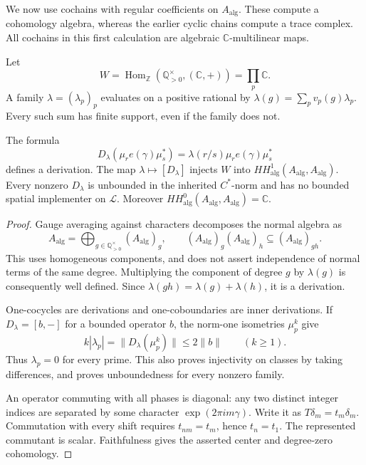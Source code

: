 We now use cochains with regular coefficients on $A_{\mathrm{alg}}$. These
compute a cohomology algebra, whereas the earlier cyclic chains compute a
trace complex. All cochains in this first calculation are algebraic $\mathbb
C$-multilinear maps.

Let
\[
 W=\operatorname{Hom}_{\mathbb Z}
        (\mathbb Q_{>0}^{\times},(\mathbb C,+))
   =\prod_p\mathbb C.
\]
A family $\lambda=(\lambda_p)_p$ evaluates on a positive rational by
$\lambda(g)=\sum_p v_p(g)\lambda_p$. Every such sum has finite support, even
if the family does not.

\begin{proposition}
\label{v4-arith:traces:gauge-derivations}
The formula
\[
 D_\lambda(\mu_re(\gamma)\mu_s^*)
  =\lambda(r/s)\mu_re(\gamma)\mu_s^*
\]
defines a derivation. The map $\lambda\mapsto[D_\lambda]$ injects $W$ into
$HH^1_{\mathrm{alg}}(A_{\mathrm{alg}},A_{\mathrm{alg}})$. Every nonzero
$D_\lambda$ is unbounded in the inherited $C^*$-norm and has no bounded
spatial implementer on $\mathcal L$. Moreover
$HH^0_{\mathrm{alg}}(A_{\mathrm{alg}},A_{\mathrm{alg}}) =\mathbb C$.
\end{proposition}
\begin{proof}
Gauge averaging against characters decomposes the normal algebra as
\[
 A_{\mathrm{alg}}
  =\bigoplus_{g\in\mathbb Q_{>0}^{\times}}(A_{\mathrm{alg}})_g,
 \qquad
 (A_{\mathrm{alg}})_g(A_{\mathrm{alg}})_h
       \subseteq(A_{\mathrm{alg}})_{gh}.
\]
This uses homogeneous components, and does not assert independence of normal
terms of the same degree. Multiplying the component of degree $g$ by
$\lambda(g)$ is consequently well defined. Since
$\lambda(gh)=\lambda(g)+\lambda(h)$, it is a derivation.

One-cocycles are derivations and one-coboundaries are inner derivations. If
$D_\lambda=[b,-]$ for a bounded operator $b$, the norm-one isometries
$\mu_p^k$ give
\[
 k|\lambda_p|=\|D_\lambda(\mu_p^k)\|
      \leq2\|b\|\qquad(k\geq1).
\]
Thus $\lambda_p=0$ for every prime. This also proves injectivity on classes
by taking differences, and proves unboundedness for every nonzero family.

An operator commuting with all phases is diagonal: any two distinct integer
indices are separated by some character $\exp(2\pi i m\gamma)$. Write it as
$T\delta_m=t_m\delta_m$. Commutation with every shift requires $t_{nm}=t_m$,
hence $t_n=t_1$. The represented commutant is scalar. Faithfulness gives the
asserted center and degree-zero cohomology.
\end{proof}

